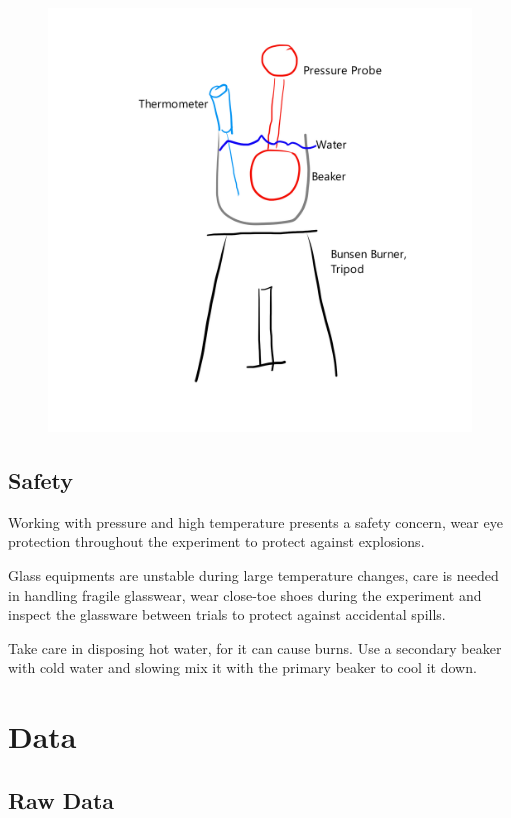 \documentclass[a4paper,12pt]{article}
\begin{document}
\begin{figure}[H]
\begin{minipage}{.6\textwidth}
        \includegraphics[scale=0.55]{assets/setupdrawn.png}
        \label{fig:setupdrawn}
    \end{minipage}
\end{figure}

\subsection{Safety}
Working with pressure and high temperature presents a safety concern, wear eye protection throughout the experiment to protect against explosions.

Glass equipments are unstable during large temperature changes, care is needed in handling fragile glasswear, wear close-toe shoes during the experiment and inspect the glassware between trials to protect against accidental spills.

Take care in disposing hot water, for it can cause burns. Use a secondary beaker with cold water and slowing mix it with the primary beaker to cool it down.

\section{Data}
\subsection{Raw Data}
\end{document}
